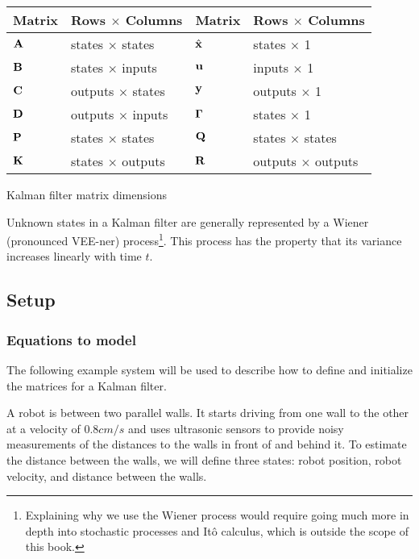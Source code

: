 \begin{booktable}
  \begin{tabular}{|ll|ll|}
    \hline
    \rowcolor{headingbg}
    \textbf{Matrix} & \textbf{Rows $\times$ Columns} &
    \textbf{Matrix} & \textbf{Rows $\times$ Columns} \\
    \hline
    $\mathbf{A}$ & states $\times$ states & $\hat{\mathbf{x}}$ & states $\times$ 1 \\
    $\mathbf{B}$ & states $\times$ inputs & $\mathbf{u}$ & inputs $\times$ 1 \\
    $\mathbf{C}$ & outputs $\times$ states & $\mathbf{y}$ & outputs $\times$ 1 \\
    $\mathbf{D}$ & outputs $\times$ inputs & $\mathbf{\Gamma}$ & states $\times$ 1 \\
    $\mathbf{P}$ & states $\times$ states & $\mathbf{Q}$ & states $\times$ states \\
    $\mathbf{K}$ & states $\times$ outputs & $\mathbf{R}$ & outputs $\times$ outputs
      \\
    \hline
  \end{tabular}
  \caption{Kalman filter matrix dimensions}
  \label{tab:kf_matrix_dims}
\end{booktable}

Unknown \glspl{state} in a Kalman filter are generally represented by a Wiener
(pronounced VEE-ner) process\footnote{Explaining why we use the Wiener process
would require going much more in depth into stochastic processes and It\^{o}
calculus, which is outside the scope of this book.}. This process has the
property that its variance increases linearly with time $t$.

\subsection{Setup}

\subsubsection{Equations to model}

The following example \gls{system} will be used to describe how to define and
initialize the matrices for a Kalman filter.

A robot is between two parallel walls. It starts driving from one wall to the
other at a velocity of $0.8 cm/s$ and uses ultrasonic sensors to provide noisy
measurements of the distances to the walls in front of and behind it. To
estimate the distance between the walls, we will define three \glspl{state}:
robot position, robot velocity, and distance between the walls.

